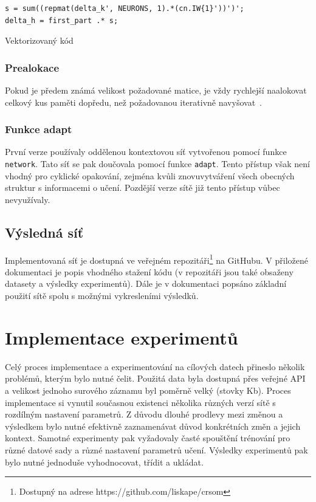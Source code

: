 \documentclass[thesis=M,czech]{FITthesis}[2012/06/26]
\begin{document}
\begin{listing}
\begin{verbatim}
s = sum((repmat(delta_k', NEURONS, 1).*(cn.IW{1}'))')';
delta_h = first_part .* s;
\end{verbatim} 
\caption{Vektorizovaný kód} 
\label{vector-code}
\end{listing}




\subsubsection*{Prealokace}
Pokud je předem známá velikost požadované matice, je vždy rychlejší naalokovat celkový kus paměti dopředu, než požadovanou iterativně navyšovat~\cite{preallocate}.




\subsubsection*{Funkce adapt}
První verze používaly oddělenou kontextovou síť vytvořenou pomocí funkce \texttt{network}. Tato síť se pak doučovala pomocí funkce \texttt{adapt}. Tento přístup však není vhodný pro cyklické opakování, zejména kvůli znovuvytváření všech obecných struktur s informacemi o učení. Pozdější verze sítě již tento přístup vůbec nevyužívaly.


\subsection{Výsledná síť}
Implementovaná síť je dostupná ve veřejném repozitáři\footnote{Dostupný na adrese https://github.com/liskape/crsom} na GitHubu. V přiložené dokumentaci je popis vhodného stažení kódu (v repozitáři jsou také obsaženy datasety a výsledky experimentů). Dále je v dokumentaci popsáno základní použití sítě spolu s možnými vykresleními výsledků.


\section{Implementace experimentů}

Celý proces implementace a experimentování na cílových datech přineslo několik problémů, kterým bylo nutné čelit. 
Použitá data byla dostupná přes veřejné API a velikost jednoho surového záznamu byl poměrně velký (stovky Kb).
Proces implementace si vynutil současnou existenci několika různých verzí sítě s rozdílným nastavení  parametrů. Z důvodu dlouhé prodlevy mezi změnou a výsledkem bylo nutné efektivně zaznamenávat důvod konkrétních změn a jejich kontext.
Samotné experimenty pak vyžadovaly časté spouštění trénování pro různé datové sady a různé nastavení parametrů učení. Výsledky experimentů pak bylo nutné jednoduše vyhodnocovat, třídit a ukládat. 
\end{document}
